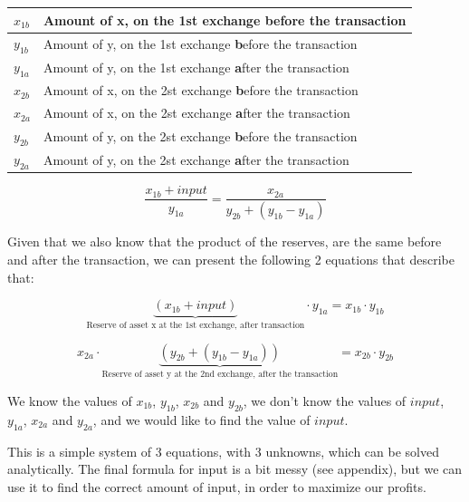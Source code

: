 \begin{table}
\centering
\begin{tabular}{|l|l|}
\hline
$x_{1b}$ & Amount of x, on the 1st exchange \textbf{b}efore the transaction \\
\hline
$y_{1b}$ & Amount of y, on the 1st exchange \textbf{b}efore the transaction \\
\hline
$y_{1a}$ & Amount of y, on the 1st exchange \textbf{a}fter the transaction \\
\hline
$x_{2b}$ & Amount of x, on the 2st exchange \textbf{b}efore the transaction \\
\hline
$x_{2a}$ & Amount of x, on the 2st exchange \textbf{a}fter the transaction \\
\hline
$y_{2b}$ & Amount of y, on the 2st exchange \textbf{b}efore the transaction \\
\hline
$y_{2a}$ & Amount of y, on the 2st exchange \textbf{a}fter the transaction \\
\hline
\end{tabular}
\end{table}

\begin{equation}
\frac{x_{1b} + input}{y_{1a}} = \frac{x_{2a}}{y_{2b} + (y_{1b} - y_{1a})}
\end{equation}

Given that we also know that the product of the reserves, are the same before and
after the transaction, we can present the following 2 equations that describe
that:

\begin{equation}
\underbrace{(x_{1b} + input)}_{\text{Reserve of asset x at the 1st exchange, after transaction}} \cdot y_{1a} = x_{1b} \cdot y_{1b}
\end{equation}

\begin{equation}
x_{2a} \cdot \underbrace{(y_{2b} + (y_{1b} - y_{1a}))}_{\text{Reserve of asset y at
the 2nd exchange, after the transaction}} = x_{2b} \cdot y_{2b}
\end{equation}

We know the values of $x_{1b}$, $y_{1b}$, $x_{2b}$ and $y_{2b}$, we don't know
the values of $input$, $y_{1a}$, $x_{2a}$ and $y_{2a}$, and we would like to find the
value of $input$.

This is a simple system of 3 equations, with 3 unknowns, which can be solved
analytically. The final formula for input is a bit messy (see appendix), but we
can use it to find the correct amount of input, in order to maximize our
profits.

